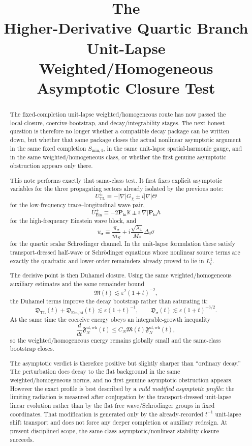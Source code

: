 \documentclass[11pt]{article}
\title{\textbf{The \TheoryName{}}\\[0.4em]
\large Higher-Derivative Quartic Branch Unit-Lapse Weighted/Homogeneous Asymptotic Closure Test}
\author{}
\date{}
\begin{document}
\maketitle

\begin{abstract}
The fixed-completion unit-lapse weighted/homogeneous route has now passed the local-closure, coercive-bootstrap, and decay/integrability stages. The next honest question is therefore no longer whether a compatible decay package can be written down, but whether that same package closes the actual nonlinear asymptotic argument in the same fixed completion \(S_{\mathrm{min},4}\), in the same unit-lapse spatial-harmonic gauge, and in the same weighted/homogeneous class, or whether the first genuine asymptotic obstruction appears only there.

This note performs exactly that same-class test. It first fixes explicit asymptotic variables for the three propagating sectors already isolated by the previous note:
\[
U_{\mathrm{TL}}^\pm
\equiv
-|\nabla|G_\chi \pm i|\nabla|\Theta
\]
for the low-frequency trace--longitudinal wave pair,
\[
U_{\mathrm{Ein}}^\pm
\equiv
-2\mathbf P_{\mathrm{hi}}\mathbb K
\pm i|\nabla|\mathbf P_{\mathrm{hi}}h
\]
for the high-frequency Einstein wave block, and
\[
u_\sigma
\equiv
\frac{\pi_\sigma}{m_S}
+ i\frac{\sqrt{\lambda_4}}{M_*}\Delta_\delta\sigma
\]
for the quartic scalar Schr\"odinger channel. In the unit-lapse formulation these satisfy transport-dressed half-wave or Schr\"odinger equations whose nonlinear source terms are exactly the quadratic and lower-order remainders already proved to lie in \(L_t^1\).

The decisive point is then Duhamel closure. Using the same weighted/homogeneous auxiliary estimates and the same remainder bound
\[
\mathfrak M(t)\lesssim \varepsilon^2(1+t)^{-2},
\]
the Duhamel terms improve the decay bootstrap rather than saturating it:
\[
\mathfrak D_{\mathrm{TL}}(t)
+ \mathfrak D_{\mathrm{Ein,hi}}(t)
\lesssim
\varepsilon(1+t)^{-1},
\qquad
\mathfrak D_\sigma(t)
\lesssim
\varepsilon(1+t)^{-3/2}.
\]
At the same time the coercive energy obeys an integrable-growth inequality
\[
\frac{d}{dt}\mathfrak F_N^{\mathrm{ul,wh}}(t)
\le
C_N\mathfrak M(t)\mathfrak F_N^{\mathrm{ul,wh}}(t),
\]
so the weighted/homogeneous energy remains globally small and the same-class bootstrap closes.

The asymptotic verdict is therefore positive but slightly sharper than ``ordinary decay.'' The perturbation does decay to the flat background in the same weighted/homogeneous norms, and no first genuine asymptotic obstruction appears. However the exact profile is best described by a \emph{mild modified asymptotic profile}: the limiting radiation is measured after conjugation by the transport-dressed unit-lapse linear evolution rather than by the flat free wave/Schr\"odinger groups in fixed coordinates. That modification is generated only by the already-recorded \(t^{-1}\) unit-lapse shift transport and does not force any deeper completion or auxiliary redesign. At present disciplined scope, the same-class asymptotic/nonlinear-stability closure succeeds.
\end{abstract}
\end{document}
